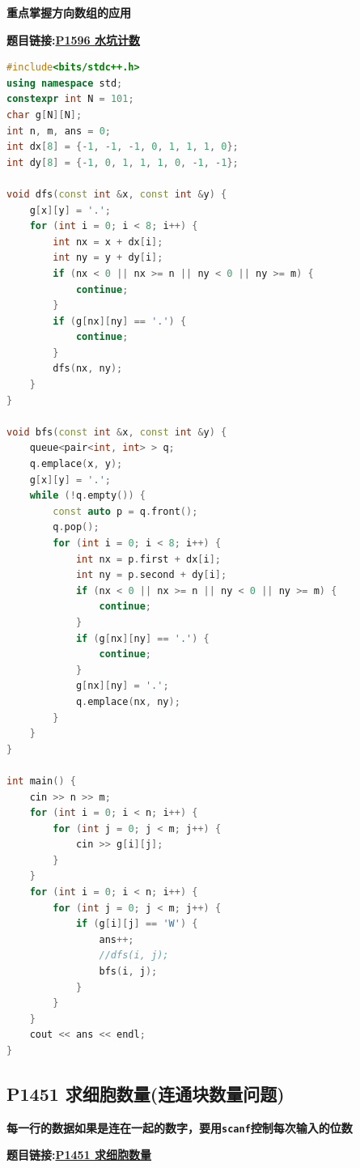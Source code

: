 \textbf{重点掌握方向数组的应用}

\textbf{题目链接:\href{https://www.luogu.com.cn/problem/P1596}{P1596 水坑计数}}

\begin{lstlisting}[language=c++,caption={DFS解法以及BFS解法}]
#include<bits/stdc++.h>
using namespace std;
constexpr int N = 101;
char g[N][N];
int n, m, ans = 0;
int dx[8] = {-1, -1, -1, 0, 1, 1, 1, 0};
int dy[8] = {-1, 0, 1, 1, 1, 0, -1, -1};

void dfs(const int &x, const int &y) {
	g[x][y] = '.';
	for (int i = 0; i < 8; i++) {
		int nx = x + dx[i];
		int ny = y + dy[i];
		if (nx < 0 || nx >= n || ny < 0 || ny >= m) {
			continue;
		}
		if (g[nx][ny] == '.') {
			continue;
		}
		dfs(nx, ny);
	}
}

void bfs(const int &x, const int &y) {
	queue<pair<int, int> > q;
	q.emplace(x, y);
	g[x][y] = '.';
	while (!q.empty()) {
		const auto p = q.front();
		q.pop();
		for (int i = 0; i < 8; i++) {
			int nx = p.first + dx[i];
			int ny = p.second + dy[i];
			if (nx < 0 || nx >= n || ny < 0 || ny >= m) {
				continue;
			}
			if (g[nx][ny] == '.') {
				continue;
			}
			g[nx][ny] = '.';
			q.emplace(nx, ny);
		}
	}
}

int main() {
	cin >> n >> m;
	for (int i = 0; i < n; i++) {
		for (int j = 0; j < m; j++) {
			cin >> g[i][j];
		}
	}
	for (int i = 0; i < n; i++) {
		for (int j = 0; j < m; j++) {
			if (g[i][j] == 'W') {
				ans++;
				//dfs(i, j);
				bfs(i, j);
			}
		}
	}
	cout << ans << endl;
}

\end{lstlisting}

\newpage

\subsection{P1451 求细胞数量(连通块数量问题)}

\textbf{每一行的数据如果是连在一起的数字，要用\texttt{scanf}控制每次输入的位数}

\textbf{题目链接:\href{https://www.luogu.com.cn/problem/P1451}{P1451 求细胞数量}}


